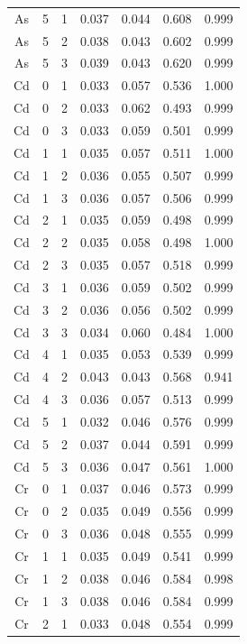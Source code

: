 \documentclass[ms, hidelinks]{uncgdissertationexp}
\theoremstyle{plain}
\theoremstyle{definition}
\theoremstyle{remark}
\begin{document}
\begin{longtable}{ccccccc}
As & 5 & 1 & 0.037 & 0.044 & 0.608 & 0.999\\
\rowcolor{gray!6}  As & 5 & 2 & 0.038 & 0.043 & 0.602 & 0.999\\
As & 5 & 3 & 0.039 & 0.043 & 0.620 & 0.999\\
\rowcolor{gray!6}  Cd & 0 & 1 & 0.033 & 0.057 & 0.536 & 1.000\\
Cd & 0 & 2 & 0.033 & 0.062 & 0.493 & 0.999\\
\rowcolor{gray!6}  Cd & 0 & 3 & 0.033 & 0.059 & 0.501 & 0.999\\
Cd & 1 & 1 & 0.035 & 0.057 & 0.511 & 1.000\\
\rowcolor{gray!6}  Cd & 1 & 2 & 0.036 & 0.055 & 0.507 & 0.999\\
Cd & 1 & 3 & 0.036 & 0.057 & 0.506 & 0.999\\
\rowcolor{gray!6}  Cd & 2 & 1 & 0.035 & 0.059 & 0.498 & 0.999\\
Cd & 2 & 2 & 0.035 & 0.058 & 0.498 & 1.000\\
\rowcolor{gray!6}  Cd & 2 & 3 & 0.035 & 0.057 & 0.518 & 0.999\\
Cd & 3 & 1 & 0.036 & 0.059 & 0.502 & 0.999\\
\rowcolor{gray!6}  Cd & 3 & 2 & 0.036 & 0.056 & 0.502 & 0.999\\
Cd & 3 & 3 & 0.034 & 0.060 & 0.484 & 1.000\\
\rowcolor{gray!6}  Cd & 4 & 1 & 0.035 & 0.053 & 0.539 & 0.999\\
Cd & 4 & 2 & 0.043 & 0.043 & 0.568 & 0.941\\
\rowcolor{gray!6}  Cd & 4 & 3 & 0.036 & 0.057 & 0.513 & 0.999\\
Cd & 5 & 1 & 0.032 & 0.046 & 0.576 & 0.999\\
\rowcolor{gray!6}  Cd & 5 & 2 & 0.037 & 0.044 & 0.591 & 0.999\\
Cd & 5 & 3 & 0.036 & 0.047 & 0.561 & 1.000\\
\rowcolor{gray!6}  Cr & 0 & 1 & 0.037 & 0.046 & 0.573 & 0.999\\
Cr & 0 & 2 & 0.035 & 0.049 & 0.556 & 0.999\\
\rowcolor{gray!6}  Cr & 0 & 3 & 0.036 & 0.048 & 0.555 & 0.999\\
Cr & 1 & 1 & 0.035 & 0.049 & 0.541 & 0.999\\
\rowcolor{gray!6}  Cr & 1 & 2 & 0.038 & 0.046 & 0.584 & 0.998\\
Cr & 1 & 3 & 0.038 & 0.046 & 0.584 & 0.999\\
\rowcolor{gray!6}  Cr & 2 & 1 & 0.033 & 0.048 & 0.554 & 0.999\\

\end{longtable}
\end{document}
